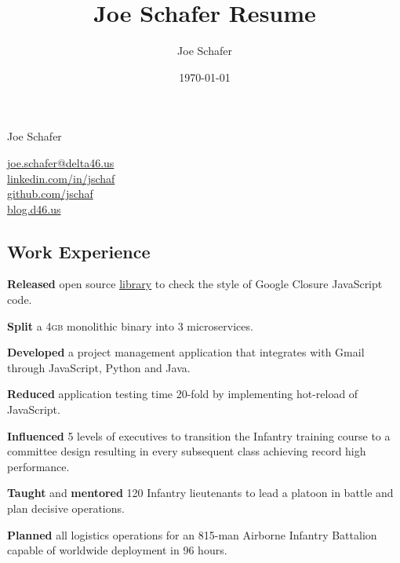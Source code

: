 \documentclass[letterpaper,11pt]{jschaf-resume}
\title{Joe Schafer Resume}
\author{Joe Schafer}
\date{\today}
\makeatletter
\newcommand*{\emailLink}{\href{mailto:joe.schafer@delta46.us}{joe.schafer@delta46.us}}
\newcommand*{\linkedInLink}{\href{http://linkedin.com/in/jschaf}{linkedin.com/in/jschaf}}
\newcommand*{\githubLink}{\href{http://github.com/jschaf}{github.com/jschaf}}
\newcommand*{\blogLink}{\href{http://blog.d46.us}{blog.d46.us}}
\newcommand*{\action}[1]{\textbf{#1}}
\newcommand*{\GB}{\textsc{gb}}
\makeatother
\begin{document}

\setlength{\columnsep}{3em}

\begin{paracol}{2}
{\fontsize{36px}{48px}\selectfont Joe Schafer}

\switchcolumn
{\fontfamily\sfdefault\selectfont
\emailLink\\
\linkedInLink\\
\githubLink\\
\blogLink\\
}
\end{paracol}


\begin{paracol}{2}
\section*{Work Experience}

\vspace{-12pt}
\begin{workitems}
\item \action{Released} open source
  \href{https://github.com/google/eslint-closure}{\ul{library}} to check the
  style of Google Closure JavaScript code.
\item \action{Split} a 4\GB{} monolithic binary into 3 microservices.
\item \action{Developed} a project management application that integrates with Gmail
  through JavaScript, Python and Java.
\item \action{Reduced} application testing time 20-fold by implementing hot-reload of JavaScript.
\end{workitems}

\begin{workitems}
\item \action{Influenced} 5 levels of executives to transition the Infantry
  training course to a committee design resulting in every subsequent class
  achieving record high performance.
\item \action{Taught} and \action{mentored} 120 Infantry lieutenants to lead a
  platoon in battle and plan decisive operations.
\end{workitems}

\begin{workitems}
\item \action{Planned} all logistics operations for an 815-man Airborne Infantry
  Battalion capable of worldwide deployment in 96 hours.


\end{workitems}
\end{paracol}
\end{document}

